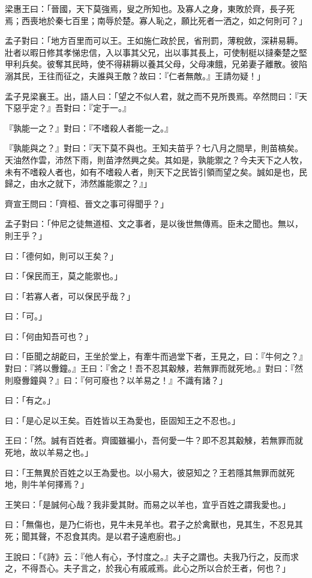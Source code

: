 \begin{pinyinscope}
梁惠王曰：「晉國，天下莫強焉，叟之所知也。及寡人之身，東敗於齊，長子死焉；西喪地於秦七百里；南辱於楚。寡人恥之，願比死者一洒之，如之何則可？」

孟子對曰：「地方百里而可以王。王如施仁政於民，省刑罰，薄稅斂，深耕易耨。壯者以暇日修其孝悌忠信，入以事其父兄，出以事其長上，可使制梃以撻秦楚之堅甲利兵矣。彼奪其民時，使不得耕耨以養其父母，父母凍餓，兄弟妻子離散。彼陷溺其民，王往而征之，夫誰與王敵？故曰：『仁者無敵。』王請勿疑！」

孟子見梁襄王。出，語人曰：「望之不似人君，就之而不見所畏焉。卒然問曰：『天下惡乎定？』吾對曰：『定于一。』

『孰能一之？』對曰：『不嗜殺人者能一之。』

『孰能與之？』對曰：『天下莫不與也。王知夫苗乎？七八月之間旱，則苗槁矣。天油然作雲，沛然下雨，則苗浡然興之矣。其如是，孰能禦之？今夫天下之人牧，未有不嗜殺人者也，如有不嗜殺人者，則天下之民皆引領而望之矣。誠如是也，民歸之，由水之就下，沛然誰能禦之？』」

齊宣王問曰：「齊桓、晉文之事可得聞乎？」

孟子對曰：「仲尼之徒無道桓、文之事者，是以後世無傳焉。臣未之聞也。無以，則王乎？」

曰：「德何如，則可以王矣？」

曰：「保民而王，莫之能禦也。」

曰：「若寡人者，可以保民乎哉？」

曰：「可。」

曰：「何由知吾可也？」

曰：「臣聞之胡齕曰，王坐於堂上，有牽牛而過堂下者，王見之，曰：『牛何之？』對曰：『將以釁鐘。』王曰：『舍之！吾不忍其觳觫，若無罪而就死地。』對曰：『然則廢釁鐘與？』曰：『何可廢也？以羊易之！』不識有諸？」

曰：「有之。」

曰：「是心足以王矣。百姓皆以王為愛也，臣固知王之不忍也。」

王曰：「然。誠有百姓者。齊國雖褊小，吾何愛一牛？即不忍其觳觫，若無罪而就死地，故以羊易之也。」

曰：「王無異於百姓之以王為愛也。以小易大，彼惡知之？王若隱其無罪而就死地，則牛羊何擇焉？」

王笑曰：「是誠何心哉？我非愛其財。而易之以羊也，宜乎百姓之謂我愛也。」

曰：「無傷也，是乃仁術也，見牛未見羊也。君子之於禽獸也，見其生，不忍見其死；聞其聲，不忍食其肉。是以君子遠庖廚也。」

王說曰：「《詩》云：『他人有心，予忖度之。』夫子之謂也。夫我乃行之，反而求之，不得吾心。夫子言之，於我心有戚戚焉。此心之所以合於王者，何也？」


\end{pinyinscope}
